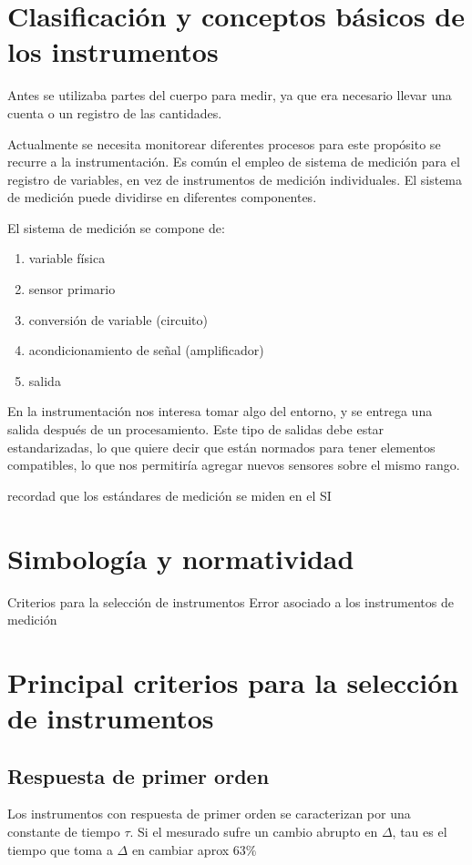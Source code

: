 \documentclass[11pt]{report}
\theoremstyle{plain}
\theoremstyle{definition}
\begin{document}
\section{Clasificación y conceptos básicos de los instrumentos}

Antes se utilizaba partes del cuerpo para medir, ya que era necesario llevar una cuenta o un registro de las cantidades.

Actualmente se necesita monitorear diferentes procesos para este propósito se recurre a la instrumentación.
Es común el empleo de sistema de medición para el registro de variables, en vez de instrumentos de medición individuales.
El sistema de medición puede dividirse en diferentes componentes.

El sistema de medición se compone de:
\begin{enumerate}
	\item variable física
	\item sensor primario
	\item conversión de variable (circuito)
	\item acondicionamiento de señal (amplificador)
	\item salida
\end{enumerate}

En la instrumentación nos interesa tomar algo del entorno, y se entrega una salida después de un procesamiento. Este tipo de salidas debe estar estandarizadas, lo que quiere decir que están normados para tener elementos compatibles, lo que nos permitiría agregar nuevos sensores sobre el mismo rango.

recordad que los estándares de medición se miden en el SI

\section{Simbología y normatividad}

Criterios para la selección de instrumentos
Error asociado a los instrumentos de medición

\section{Principal criterios para la selección de instrumentos}

\subsection*{Respuesta de primer orden}
Los instrumentos con respuesta de primer orden se caracterizan por una constante de tiempo $\tau$.
Si el mesurado sufre un cambio abrupto en $\Delta$, tau es el tiempo que toma a $\Delta$ en cambiar aprox $63\%$
\end{document}
